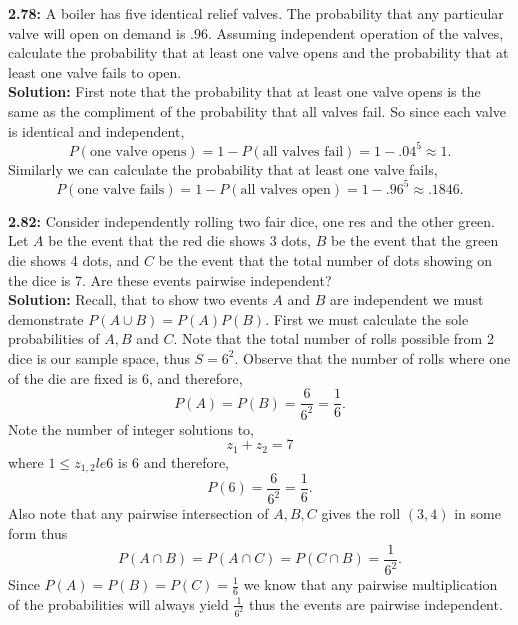 \documentclass[12pt]{article}
\theoremstyle{homework}
\begin{document}
\textbf{2.78:} A boiler has five identical relief valves. The probability that any particular valve will open on demand is $.96$.
Assuming independent operation of the valves, calculate the probability that at least one valve opens and the probability that at least one valve fails to open.\\ 

\textbf{Solution:} First note that the probability that at least one valve opens is the same as the compliment of the probability that all valves fail. So since each valve is identical and independent,
\begin{equation*}
  P(\text{one valve opens}) = 1 - P(\text{all valves fail}) = 1 - .04^5 \approx 1.
\end{equation*}
Similarly we can calculate the probability that at least one valve fails,
\begin{equation*}
  P(\text{one valve fails}) = 1 - P(\text{all valves open}) = 1 - .96^5 \approx .1846.
\end{equation*}
\vspace{1in}






\textbf{2.82:} Consider independently rolling two fair dice, one res and the other green. Let $A$ be the event that the red die shows 3 dots, 
$B$ be the event that the green die shows 4 dots, and $C$ be the event that the total number of dots showing on the dice is 7. Are these events pairwise independent?\\

\textbf{Solution:} Recall, that to show two events $A$ and $B$ are independent we must demonstrate $P(A\cup B) = P(A)P(B)$. First we must calculate the sole
probabilities of $A, B$ and $C$. Note that the total number of rolls possible from 2 dice is our sample space, thus $S = 6^2$. Observe that the number of rolls where one of the die are fixed is 6, and therefore,
\begin{equation*}
  P(A) = P(B) = \dfrac{6}{6^2} = \dfrac{1}{6}.
\end{equation*}
Note the number of integer solutions to,
\begin{equation*}
  z_1 + z_2 = 7
\end{equation*}
where $1 \le z_{1,2} le 6$ is 6 and therefore,
\begin{equation*}
  P(6) = \dfrac{6}{6^2} = \dfrac{1}{6}.
\end{equation*}
Also note that any pairwise intersection of $A,B,C$ gives the roll $(3,4)$ in some form thus
\begin{equation*}
  P(A\cap B) = P(A\cap C) = P(C\cap B) =  \dfrac{1}{6^2}.
\end{equation*}
Since $P(A) = P(B) = P(C) = \frac{1}{6}$ we know that any pairwise multiplication of the probabilities will always yield $\frac{1}{6^2}$ thus the events are pairwise independent. 
\vspace{1in}
\end{document}
